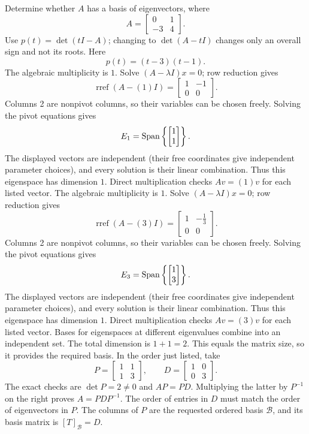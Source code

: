 \goal Determine whether $A$ has a basis of eigenvectors, where
\[A=\begin{bmatrix}0&1\\-3&4\end{bmatrix}.\]
Use $p(t)=\det(tI-A)$; changing to $\det(A-tI)$ changes only an overall sign and not its roots. Here
\[p(t)=\left(t - 3\right) \left(t - 1\right).\]
The algebraic multiplicity is $1$. Solve $(A-\lambda I)x=0$; row reduction gives
\[\operatorname{rref}(A-(1)I)=\begin{bmatrix}1&-1\\0&0\end{bmatrix}.\]
Columns 2 are nonpivot columns, so their variables can be chosen freely. Solving the pivot equations gives
\[E_{1}=\operatorname{Span}\left\{\begin{bmatrix}1\\1\end{bmatrix}\right\}.\]
The displayed vectors are independent (their free coordinates give independent parameter choices), and every solution is their linear combination. Thus this eigenspace has dimension $1$. Direct multiplication checks $Av=(1)v$ for each listed vector.
The algebraic multiplicity is $1$. Solve $(A-\lambda I)x=0$; row reduction gives
\[\operatorname{rref}(A-(3)I)=\begin{bmatrix}1&- \frac{1}{3}\\0&0\end{bmatrix}.\]
Columns 2 are nonpivot columns, so their variables can be chosen freely. Solving the pivot equations gives
\[E_{3}=\operatorname{Span}\left\{\begin{bmatrix}1\\3\end{bmatrix}\right\}.\]
The displayed vectors are independent (their free coordinates give independent parameter choices), and every solution is their linear combination. Thus this eigenspace has dimension $1$. Direct multiplication checks $Av=(3)v$ for each listed vector.
Bases for eigenspaces at different eigenvalues combine into an independent set. The total dimension is $1+1=2$.
This equals the matrix size, so it provides the required basis. In the order just listed, take
\[P=\begin{bmatrix}1&1\\1&3\end{bmatrix},\qquad D=\begin{bmatrix}1&0\\0&3\end{bmatrix}.\]
The exact checks are $\det P=2\ne0$ and $AP=PD$. Multiplying the latter by $P^{-1}$ on the right proves $A=PDP^{-1}$. The order of entries in $D$ must match the order of eigenvectors in $P$.
The columns of $P$ are the requested ordered basis $\mathcal B$, and its basis matrix is $[T]_{\mathcal B}=D$.

